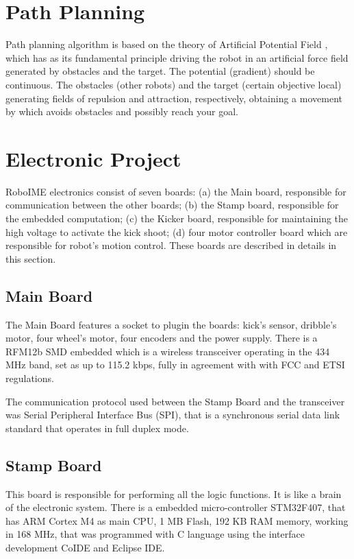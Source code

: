 \documentclass{llncs}
\begin{document}
\section{Path Planning}

Path planning algorithm is based on the theory of Artificial Potential Field \cite{CPA}, which has as its fundamental principle driving the robot in an artificial force field generated by obstacles and the target. The potential (gradient) should be continuous. The obstacles (other robots) and the target (certain objective local) generating fields of repulsion and attraction, respectively, obtaining a movement by which avoids obstacles and possibly reach your goal.


\section{Electronic Project}
RoboIME electronics consist of seven boards: (a) the Main board, responsible for communication between the other boards; (b) the Stamp board,  responsible  for the embedded computation; (c) the Kicker board, responsible for maintaining the high voltage to activate the kick shoot; (d) four motor controller board which are responsible for robot's motion control. These boards are described in details in this section.

\subsection{Main Board}
The Main Board features a socket to plugin the boards: kick's sensor, dribble's motor, four wheel's motor, four encoders and the power supply. There is a RFM12b SMD embedded which is a wireless transceiver operating in the 434 MHz band, set as up to 115.2 kbps, fully in agreement with with FCC and ETSI regulations. 

The communication protocol used between the Stamp Board and the transceiver was Serial Peripheral Interface Bus (SPI), that  is a synchronous serial data link standard that operates in full duplex mode.

\subsection{Stamp Board}
This board is responsible  for performing all the logic functions. It is like a brain of the electronic system. There is a embedded micro-controller STM32F407, that has ARM Cortex M4 as main CPU, 1 MB Flash, 192 KB RAM memory, working in 168 MHz, that was programmed with C language using the  interface development CoIDE and Eclipse IDE. 
\end{document}
